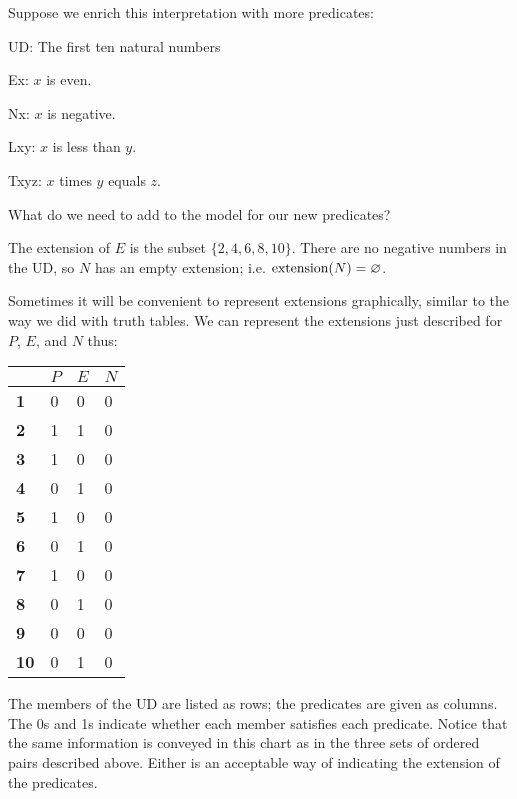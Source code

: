 Suppose we enrich this interpretation with more predicates:
\label{10UD}
\begin{ekey}
\item{UD:} The first ten natural numbers
\item{Ex:} $x$ is even.
\item{Nx:} $x$ is negative.
\item{Lxy:} $x$ is less than $y$.
\item{Txyz:} $x$ times $y$ equals $z$.
\end{ekey}
What do we need to add to the model for our new predicates?

The extension of $E$ is the subset $\{2, 4, 6, 8, 10\}$. There are no negative numbers in the UD, so $N$ has an empty extension; i.e. $\mbox{extension}(N)=\varnothing$.

Sometimes it will be convenient to represent extensions graphically, similar to the way we did with truth tables. We can represent the extensions just described for $P$, $E$, and $N$ thus:

\begin{table}[h!]
\centering
\begin{tabular}{l|l|l|l}
            & $P$ & $E$ & $N$ \\ \hline
\textbf{1}  & 0  & 0          & 0          \\
\textbf{2}  & 1  & 1          & 0          \\
\textbf{3}  & 1  & 0          & 0          \\
\textbf{4}  & 0  & 1          & 0          \\
\textbf{5}  & 1  & 0          & 0          \\
\textbf{6}  & 0  & 1          & 0          \\
\textbf{7}  & 1  & 0          & 0          \\
\textbf{8}  & 0  & 1          & 0          \\
\textbf{9}  & 0  & 0          & 0          \\
\textbf{10} & 0 & 1          & 0         
\end{tabular}
\end{table}

The members of the UD are listed as rows; the predicates are given as columns. The 0s and 1s indicate whether each member satisfies each predicate. Notice that the same information is conveyed in this chart as in the three sets of ordered pairs described above. Either is an acceptable way of indicating the extension of the predicates.

